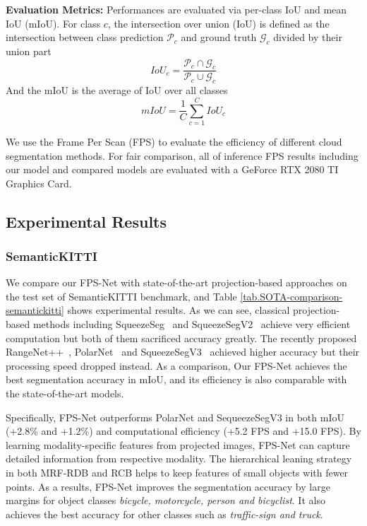 \documentclass[preprint,review,3p]{elsarticle}
\begin{document}
\textbf{Evaluation Metrics:} Performances are evaluated via per-class IoU and mean IoU (mIoU). For class $c$, the intersection over union (IoU) is defined as the intersection between class prediction $\mathcal{P}_c$ and ground truth $\mathcal{G}_c$ divided by their union part
\begin{equation}
    {IoU}_{c}=\frac{\mathcal{P}_c \cap \mathcal{G}_c}{\mathcal{P}_c \cup \mathcal{G}_c}
\end{equation}
And the mIoU is the average of IoU over all classes
\begin{equation}
    mIoU=\frac{1}{C}\sum_{c=1}^{C}{{IoU}_c}
\end{equation}

We use the Frame Per Scan (FPS) to evaluate the efficiency of different cloud segmentation methods. For fair comparison, all of inference FPS results including our model and compared models are evaluated with a GeForce RTX 2080 TI Graphics Card.

\subsection{Experimental Results}\label{Sec.benchmarks_results}
\subsubsection{SemanticKITTI}

We compare our FPS-Net with 
state-of-the-art projection-based approaches on the test set of SemanticKITTI benchmark, and Table \ref{tab.SOTA-comparison-semantickitti} shows experimental results. As we can see, classical projection-based methods including SqueezeSeg~\cite{wu2018squeezeseg} and SqueezeSegV2~\cite{wu2019squeezesegv2} achieve very efficient computation but both of them sacrificed accuracy greatly. The recently proposed RangeNet++~\cite{milioto2019rangenet++}, PolarNet~\cite{zhang2020polarnet} and SqueezeSegV3~\cite{xu2020squeezesegv3} achieved higher accuracy but their processing speed dropped instead. As a comparison, Our FPS-Net achieves the best segmentation accuracy in mIoU, and its efficiency is also comparable with the state-of-the-art models.

Specifically, FPS-Net outperforms PolarNet \cite{zhang2020polarnet} and SequeezeSegV3 \cite{xu2020squeezesegv3} in both mIoU (+2.8\% and +1.2\%) and computational efficiency (+5.2 FPS and +15.0 FPS). 
By learning modality-specific features from projected images, FPS-Net can capture detailed information from respective modality. The hierarchical leaning strategy in both MRF-RDB and RCB helps to keep features of small objects with fewer points. As a results, FPS-Net improves the segmentation accuracy by large margins for object classes \textit{bicycle, motorcycle, person and bicyclist}. It also achieves the best accuracy for other classes such as \textit{traffic-sign and truck}.
\end{document}
